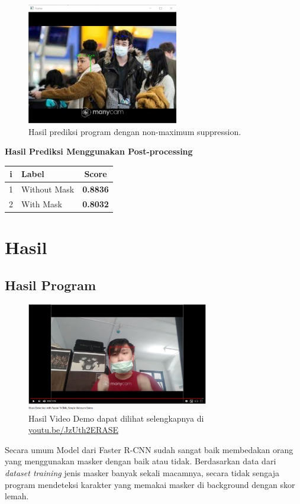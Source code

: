 \documentclass{article}
\begin{document}
	\begin{figure}[H]
		\centering
		\includegraphics[width=250px]{../demo/Results/implementation/with_nms0.png}
		\caption{Hasil prediksi program dengan non-maximum suppression.}
  	\end{figure}
	{\large{\textbf{Hasil Prediksi Menggunakan Post-processing}}}
	\begin{table}[H]
		\centering
		\begin{tabular}{clc}
			\hline
			\textbf{i} & \textbf{Label}               & \textbf{Score}  \\ \hline
			1 & Without Mask        & \textbf{0.8836} \\
			2 & With Mask           & \textbf{0.8032} \\
		\end{tabular}
	\end{table}

  \newpage
  \section{Hasil}
  
  \subsection{Hasil Program}
  \begin{figure}[H]
	\centering
	\includegraphics[width=300px]{benchmark/hasil3.png}
	\caption{Hasil Video Demo dapat dilihat selengkapnya di \href{https://youtu.be/JzUth2ERASE}{youtu.be/JzUth2ERASE}}
  \end{figure}
  \par Secara umum Model dari Faster R-CNN sudah sangat baik membedakan orang yang menggunakan masker dengan baik atau tidak. Berdasarkan data dari \textit{dataset training} jenis masker banyak sekali macamnya, secara tidak sengaja program mendeteksi karakter yang memakai masker di background dengan skor lemah. 
\end{document}
